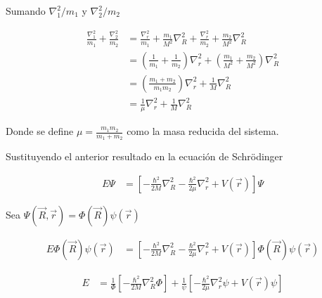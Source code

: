 \begin{frame}{}
    
    Sumando $ \nabla_1^2 / m_1 $ y $ \nabla_2^2 / m_2 $
    
    \begin{align*}
        \frac{\nabla_1^2}{m_1} + \frac{\nabla_2^2}{m_2}
        &= \frac{\nabla_r^2}{m_1} + \frac{m_1}{M^2} \nabla_R^2 + \frac{\nabla_r^2}{m_2} + \frac{m_2}{M^2} \nabla_R^2 \\
        &= \left( \frac{1}{m_1} + \frac{1}{m_2} \right) \nabla_r^2 + \left(  \frac{m_1}{M^2} + \frac{m_2}{M^2} \right) \nabla_R^2 \\
        &= \left( \frac{m_1 + m_2}{m_1 m_2}  \right) \nabla_r^2 + \frac{1}{M} \nabla_R^2 \\
        &= \frac{1}{ \mu}  \nabla_r^2 + \frac{1}{M} \nabla_R^2
    \end{align*}
    
    Donde se define $\mu = \frac{m_1 m_2}{m_1 + m_2}$ como la masa reducida del sistema.
    
\end{frame}

\begin{frame}{}
    
    Sustituyendo el anterior resultado en la ecuación de Schr\"odinger
    
    \begin{align*}
        E \Psi &=  \left[ - \frac{\hbar^2}{2M} \nabla^{2}_{R} - \frac{\hbar^2}{2 \mu } \nabla^{2}_{r} + V( \Vec{r} ) \right] \Psi
    \end{align*}
    
    Sea $ \Psi (\Vec{R}, \Vec{r}) = \Phi ( \Vec{R}) \psi (\Vec{r} ) $
    
    \begin{align*}
        E \Phi ( \Vec{R}) \psi (\Vec{r} ) &=  \left[ - \frac{\hbar^2}{2M} \nabla^{2}_{R} - \frac{\hbar^2}{2 \mu } \nabla^{2}_{r} + V( \Vec{r} ) \right] \Phi ( \Vec{R}) \psi (\Vec{r} ) 
    \end{align*}
    
    \begin{align*}
        E &= \frac{1}{\Phi} \left[ - \frac{\hbar^2}{2M} \nabla^{2}_{R} \Phi \right] + \frac{1}{\psi} \left[ - \frac{\hbar^2}{2 \mu } \nabla^{2}_{r} \psi + V( \Vec{r} ) \psi \right]
    \end{align*}
    
\end{frame}


